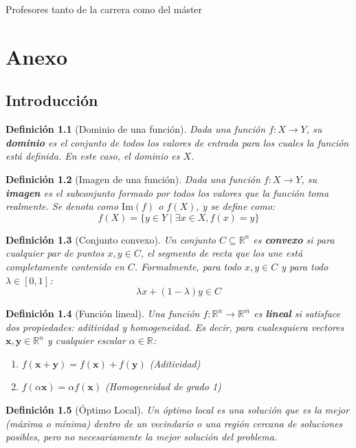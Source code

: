 \documentclass[12pt,a4paper]{book}
\newtheorem{defi}{Definición}[section]
\begin{document}
Profesores tanto de la carrera como del máster 

\chapter{Anexo}
\section{Introducción}
\begin{defi}[Dominio de una función]
\label{def:dominio}
Dada una función $f: X \to Y$, su \textbf{dominio} es el conjunto de todos los valores de entrada para los cuales la función está definida. En este caso, el dominio es $X$.
\end{defi}

\begin{defi}[Imagen de una función]
Dada una función $f: X \to Y$, su \textbf{imagen} es el subconjunto formado por todos los valores que la función toma realmente. Se denota como $\text{Im}(f)$ o $f(X)$, y se define como:
$$ f(X) = \{y \in Y \mid \exists x \in X, f(x) = y \} $$
\end{defi}

\begin{defi}[Conjunto convexo]
\label{def:convexo}
Un conjunto $C \subseteq \mathbb{R}^n$ es \textbf{convexo} si para cualquier par de puntos $x, y \in C$, el segmento de recta que los une está completamente contenido en $C$. Formalmente, para todo $x, y \in C$ y para todo $\lambda \in [0, 1]$:
$$ \lambda x + (1-\lambda)y \in C $$
\end{defi}

\begin{defi}[Función lineal]
\label{def:f_lineal}
Una función $f: \mathbb{R}^n \to \mathbb{R}^m$ es \textbf{lineal} si satisface dos propiedades: aditividad y homogeneidad. Es decir, para cualesquiera vectores $\mathbf{x}, \mathbf{y} \in \mathbb{R}^n$ y cualquier escalar $\alpha \in \mathbb{R}$:
\begin{enumerate}
    \item $f(\mathbf{x}+\mathbf{y}) = f(\mathbf{x}) + f(\mathbf{y})$ (Aditividad)
    \item $f(\alpha \mathbf{x}) = \alpha f(\mathbf{x})$ (Homogeneidad de grado 1)
\end{enumerate}
\end{defi}

\begin{defi}[Óptimo Local]
\label{def:optimo_local}
Un óptimo local es una solución que es la mejor (máxima o mínima) dentro de un vecindario o una región cercana de soluciones posibles,
pero no necesariamente la mejor solución del problema.
\end{defi}
\end{document}
